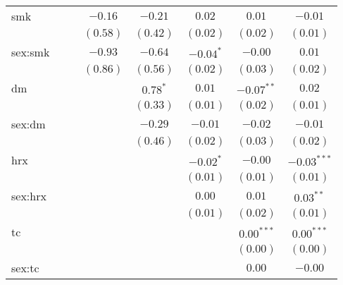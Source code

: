\begin{tabular}{l c c c c c c c}
smk                  &               &               & $-0.16$      & $-0.21$       & $0.02$       & $0.01$        & $-0.01$       \\
                     &               &               & $(0.58)$     & $(0.42)$      & $(0.02)$     & $(0.02)$      & $(0.01)$      \\
sex:smk              &               &               & $-0.93$      & $-0.64$       & $-0.04^{*}$  & $-0.00$       & $0.01$        \\
                     &               &               & $(0.86)$     & $(0.56)$      & $(0.02)$     & $(0.03)$      & $(0.02)$      \\
dm                   &               &               &              & $0.78^{*}$    & $0.01$       & $-0.07^{**}$  & $0.02$        \\
                     &               &               &              & $(0.33)$      & $(0.01)$     & $(0.02)$      & $(0.01)$      \\
sex:dm               &               &               &              & $-0.29$       & $-0.01$      & $-0.02$       & $-0.01$       \\
                     &               &               &              & $(0.46)$      & $(0.02)$     & $(0.03)$      & $(0.02)$      \\
hrx                  &               &               &              &               & $-0.02^{*}$  & $-0.00$       & $-0.03^{***}$ \\
                     &               &               &              &               & $(0.01)$     & $(0.01)$      & $(0.01)$      \\
sex:hrx              &               &               &              &               & $0.00$       & $0.01$        & $0.03^{**}$   \\
                     &               &               &              &               & $(0.01)$     & $(0.02)$      & $(0.01)$      \\
tc                   &               &               &              &               &              & $0.00^{***}$  & $0.00^{***}$  \\
                     &               &               &              &               &              & $(0.00)$      & $(0.00)$      \\
sex:tc               &               &               &              &               &              & $0.00$        & $-0.00$       \\

\end{tabular}
